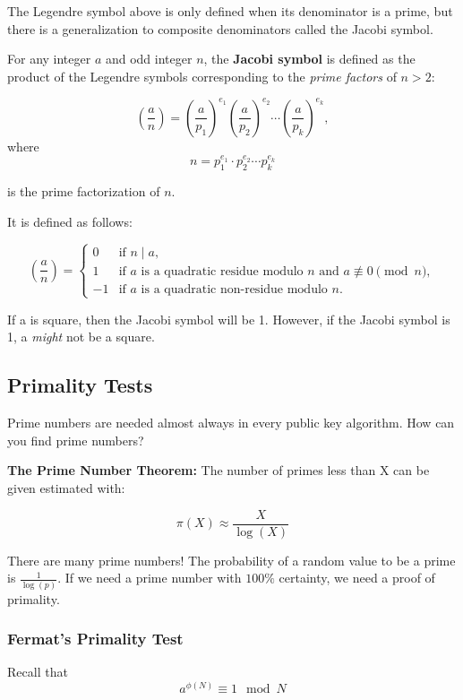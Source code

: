 The Legendre symbol above is only defined when its denominator is a prime, but there is a generalization to composite denominators called the Jacobi symbol.

\begin{defn}
    For any integer \( a \) and odd integer \( n \), the \textbf{Jacobi symbol} is defined as the product of the Legendre symbols corresponding to the \emph{prime factors} of $n > 2$: 

    \[
\left( \frac{a}{n} \right) = \left( \frac{a}{p_1} \right)^{e_1} \left( \frac{a}{p_2} \right)^{e_2} \cdots \left( \frac{a}{p_k} \right)^{e_k},
    \]
where
\[ n = p_1^{e_1} \cdot p_2^{e_2} \cdots p_k^{e_k} \]

is the prime factorization of $n$. 
\end{defn}

It is defined as follows:

\[
\left( \frac{a}{n} \right) = 
\begin{cases}
0 & \text{if } n \mid a, \\
1 & \text{if } a \text{ is a quadratic residue modulo } n \text{ and } a \not\equiv 0 \pmod{n}, \\
-1 & \text{if } a \text{ is a quadratic non-residue modulo } n.
\end{cases}
\]

\begin{rem}
If a is square, then the Jacobi symbol will be 1. However, if the Jacobi symbol is 1, a \emph{might} not be a square. 
\end{rem}

\subsection{Primality Tests}
Prime numbers are needed almost always in every public key algorithm. How can you find prime numbers?

\begin{thm}
    \textbf{The Prime Number Theorem:} The number of primes less than X can be given estimated with: 

    \[ \pi(X) \approx \frac{X}{\log(X)} \]
\end{thm}

There are many prime numbers! The probability of a random value to be a prime is $\frac{1}{\log(p)}$. If we need a prime number with $100 \%$ certainty, we need a proof of primality.

\subsubsection{Fermat's Primality Test}
Recall that 
\[ a^{\phi(N)} \equiv 1 \mod N \]


